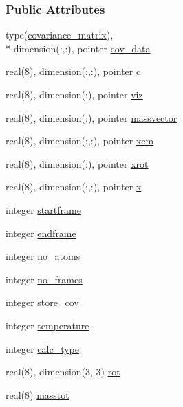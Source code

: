 \subsubsection*{Public Attributes}
\begin{DoxyCompactItemize}
\item 
type(\hyperlink{structcalc__entropy_1_1covariance__matrix}{covariance\-\_\-matrix}), \\*
dimension(\-:,\-:), pointer \hyperlink{structcalc__entropy_1_1trajectory_a16a9b8565b51240772698613492b4c37}{cov\-\_\-data}
\item 
real(8), dimension(\-:,\-:), pointer \hyperlink{structcalc__entropy_1_1trajectory_a5287f1d835929acc0a274bd7ac677b31}{c}
\item 
real(8), dimension(\-:), pointer \hyperlink{structcalc__entropy_1_1trajectory_a0eca6b35fc3c4adddb048e999e272224}{viz}
\item 
real(8), dimension(\-:), pointer \hyperlink{structcalc__entropy_1_1trajectory_a932ec0d37a55f606eb14f1eac76d9a0e}{massvector}
\item 
real(8), dimension(\-:,\-:), pointer \hyperlink{structcalc__entropy_1_1trajectory_aa0151e3b9fc9b624b36f1bd5919d5a77}{xcm}
\item 
real(8), dimension(\-:), pointer \hyperlink{structcalc__entropy_1_1trajectory_af194da745b1b19e925c45d444c923d4f}{xrot}
\item 
real(8), dimension(\-:,\-:), pointer \hyperlink{structcalc__entropy_1_1trajectory_a444837456c379926efe339c483140946}{x}
\item 
integer \hyperlink{structcalc__entropy_1_1trajectory_a28ac01dabd46897dc57829d565024cce}{startframe}
\item 
integer \hyperlink{structcalc__entropy_1_1trajectory_a96ae41a3e3c46382771def88367baadf}{endframe}
\item 
integer \hyperlink{structcalc__entropy_1_1trajectory_a3330471076fd4696308976155a625fb0}{no\-\_\-atoms}
\item 
integer \hyperlink{structcalc__entropy_1_1trajectory_adf0e530d84e91fdbc0cec327f9a9c2ef}{no\-\_\-frames}
\item 
integer \hyperlink{structcalc__entropy_1_1trajectory_ab4de63f777ed6c1da6e7fdb88ad5ae78}{store\-\_\-cov}
\item 
integer \hyperlink{structcalc__entropy_1_1trajectory_a9267bb88bf5c84d80b32ad1ed549d600}{temperature}
\item 
integer \hyperlink{structcalc__entropy_1_1trajectory_af9701f485b447a73af43d4551edcf1ee}{calc\-\_\-type}
\item 
real(8), dimension(3, 3) \hyperlink{structcalc__entropy_1_1trajectory_a1a969b71f000083c3ec56fcc744b010f}{rot}
\item 
real(8) \hyperlink{structcalc__entropy_1_1trajectory_a994705bd976a2bba0cc174650708de37}{masstot}
\end{DoxyCompactItemize}


